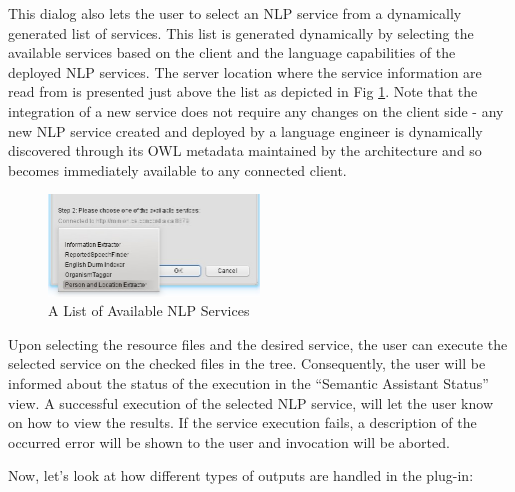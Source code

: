 This dialog also lets the user to select an NLP service from a dynamically
generated list of services. This list is generated dynamically by selecting the
available services based on the client and the language capabilities of the
deployed NLP services. The server location where the service information are read from is presented just above the list as depicted in Fig \ref{fig:eclipse_services}. Note that the integration of a new service does not
require any changes on the client side - any new NLP service created and
deployed by a language engineer is dynamically discovered through its OWL
metadata maintained by the architecture and so becomes immediately available to
any connected client.

\begin{figure}[htb]
\begin{center}
  \includegraphics[width=0.5\textwidth]{pictures/eclipse_services.jpg}
  \caption{A List of Available NLP Services}
  \label{fig:eclipse_services}
\end{center}
\end{figure}

Upon selecting the resource files and the desired service, the user can execute
the selected service on the checked files in the tree. Consequently, the user will be informed about the status of the execution in the ``Semantic Assistant Status'' view. A successful execution of the selected NLP service, will let the user know on how to view the results. If the service execution fails, a description of the occurred error will be shown to the user and invocation will be aborted.

Now, let's look at how different types of outputs are handled in the plug-in:

